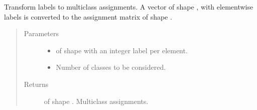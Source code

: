 \documentclass[letterpaper,10pt,english]{sphinxmanual}
\begin{document}
\begin{fulllineitems}
\label{\detokenize{pusion.util.transformer:pusion.util.transformer.transform_label_vector_to_class_assignment_matrix}}
\sphinxAtStartPar
Transform labels to multiclass assignments. A vector of shape , with element\sphinxhyphen{}wise labels is converted
to the assignment matrix of shape .
\begin{quote}\begin{description}
\item[{Parameters}] \leavevmode\begin{itemize}
\item {} 
\sphinxAtStartPar
{} \textendash{}  of shape  with an integer label per element.

\item {} 
\sphinxAtStartPar
{} \textendash{} Number of classes to be considered.

\end{itemize}

\item[{Returns}] \leavevmode
\sphinxAtStartPar
{} of shape . Multiclass assignments.

\end{description}\end{quote}

\end{fulllineitems}

\end{document}

